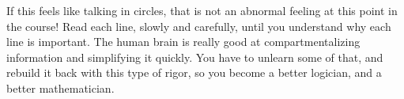 \documentclass{ximera}
\begin{document}
If this feels like talking in circles, that is not an abnormal feeling at this point in the course!  Read each line, slowly and carefully, until you understand why each line is important.  The human brain is really good at compartmentalizing information and simplifying it quickly.  You have to unlearn some of that, and rebuild it back with this type of rigor, so you become a better logician, and a better mathematician.
\end{document}
